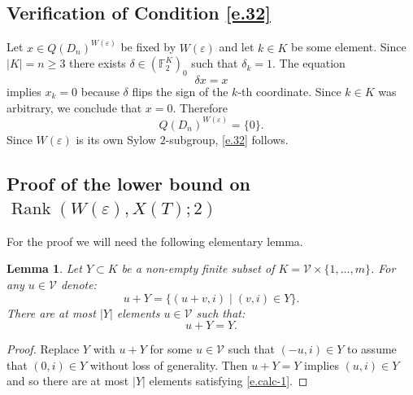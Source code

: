 \documentclass[12pt]{amsart}
\numberwithin{equation}{section}
\newtheorem{lemma}[theorem]{Lemma}
\theoremstyle{definition}
\newcommand{\cV}{\mathcal{V}}
\newcommand{\bF}{\mathbb{F}}
\newcommand{\SymRank}{\operatorname{Rank}}
\newcommand{\eps}{\varepsilon}
\begin{document}
\subsection*{Verification of Condition \eqref{e.32}}
   Let $x \in Q(D_n)^{W(\eps)}$ be fixed by $W(\eps)$ and let $k\in K$ be some element. Since $ |K|= n \geq 3$ there exists $\delta\in (\bF_2^K)_0$ such that $\delta_k = 1$. The equation
   $$\delta x = x$$
   implies $x_k = 0$ because $\delta$ flips the sign of the $k$-th coordinate. Since $k\in K$ was arbitrary, we conclude that $x = 0$.
   Therefore $$Q(D_n)^{W(\eps)}=\{0\}.$$ Since $W(\eps)$ is its own Sylow $2$-subgroup, \eqref{e.32} follows.

\subsection*{Proof of the lower bound on \texorpdfstring{$\SymRank(W(\eps),X(T);2)$}{the symmetric rank}}
For the proof we will need the following elementary lemma.
\begin{lemma}\label{lem.elementary_act_on_subsets}
    Let $Y \subset K$ be a non-empty finite subset of $K = \cV\times \{1,\dots,m\}$. For any $u\in \cV$ denote:
    $$u+Y = \{ (u+v,i) \mid (v,i)\in Y\}.$$
    There are at most ${|Y|}$ elements $u\in \cV$ such that:
    \begin{equation}\label{e.calc-1}
        u+Y= Y.
    \end{equation}
\end{lemma}
\begin{proof}
Replace $Y$ with $u+Y$ for some $u\in \cV$ such that $(-u,i)\in Y$ to assume that $(0,i)\in Y$ without loss of generality. Then $u+Y =Y$ implies $(u,i)\in Y$ and so there are at most $|Y|$ elements satisfying \eqref{e.calc-1}. 
\end{proof}
\end{document}
